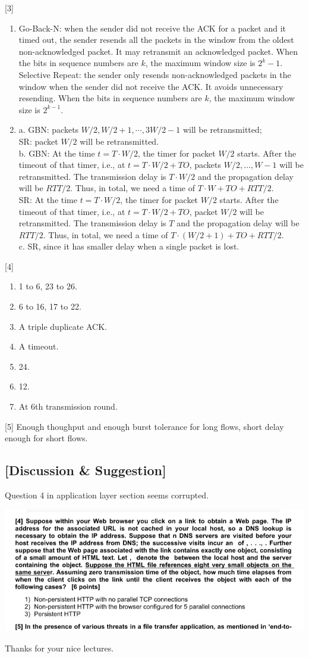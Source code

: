 \documentclass{homework}
\begin{document}
[3]
\begin{enumerate}[label={\arabic*)}]
  \item Go-Back-N: when the sender did not receive the ACK for a packet and it timed out, the sender resends all the packets in the window from the oldest non-acknowledged packet. It may retransmit an acknowledged packet. When the bits in sequence numbers are $k$, the maximum window size is $2^k-1$. \\
  Selective Repeat: the sender only resends non-acknowledged packets in the window when the sender did not receive the ACK. It avoids unnecessary resending. When the bits in sequence numbers are $k$, the maximum window size is $2^{k-1}$. 
  \item a. GBN: packets $W/2, W/2+1,\cdots, 3W/2-1$ will be retransmitted;\\
  SR: packet $W/2$ will be retransmitted.\\
  b. GBN: At the time $t=T\cdot W/2$, the timer for packet $W/2$ starts. After the timeout of that timer, i.e., at $t=T\cdot W/2 + TO$, packets $W/2,\dots,W-1$ will be retransmitted. The transmission delay is $T\cdot W/2$ and the propagation delay will be $RTT/2$. Thus, in total, we need a time of $T\cdot W + TO + RTT/2$. \\
  SR: At the time $t=T\cdot W/2$, the timer for packet $W/2$ starts. After the timeout of that timer, i.e., at $t=T\cdot W/2 + TO$, packet $W/2$ will be retransmitted. The transmission delay is $T$ and the propagation delay will be $RTT/2$. Thus, in total, we need a time of $T\cdot (W/2+1)+ TO + RTT/2$. \\
  c. SR, since it has smaller delay when a single packet is lost.
\end{enumerate}

[4] 
\begin{enumerate}[label={\arabic*)}]
  \item 1 to 6, 23 to 26.
  \item 6 to 16, 17 to 22.
  \item A triple duplicate ACK.
  \item A timeout.
  \item 24.
  \item 12.
  \item At 6th transmission round.
\end{enumerate}

[5] Enough thoughput and enough burst tolerance for long flows, short delay enough for short flows.

\subsection*{[Discussion \& Suggestion]}

Question 4 in application layer section seems corrupted.

\includegraphics[width=\textwidth]{sc}

Thanks for your nice lectures.
\end{document}
